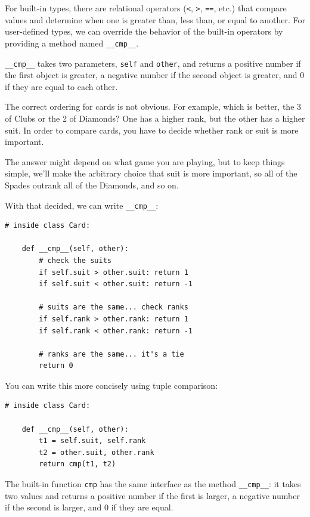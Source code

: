 \documentclass[10pt]{book}
\begin{document}
\begin{CJK}{UTF8}{gbsn}
For built-in types, there are relational operators
({\tt <}, {\tt >}, {\tt ==}, etc.)
that compare
values and determine when one is greater than, less than, or equal to
another.  For user-defined types, we can override the behavior of
the built-in operators by providing a method named
\verb"__cmp__".  

\verb"__cmp__" takes two parameters, {\tt self} and {\tt other},
and returns a positive number if the first object is greater, a
negative number if the second object is greater, and 0 if they are
equal to each other.

The correct ordering for cards is not obvious.
For example, which
is better, the 3 of Clubs or the 2 of Diamonds?  One has a higher
rank, but the other has a higher suit.  In order to compare
cards, you have to decide whether rank or suit is more important.

The answer might depend on what game you are playing, but to keep
things simple, we'll make the arbitrary choice that suit is more
important, so all of the Spades outrank all of the Diamonds,
and so on.

With that decided, we can write \verb"__cmp__":

\begin{verbatim}
# inside class Card:

    def __cmp__(self, other):
        # check the suits
        if self.suit > other.suit: return 1
        if self.suit < other.suit: return -1

        # suits are the same... check ranks
        if self.rank > other.rank: return 1
        if self.rank < other.rank: return -1

        # ranks are the same... it's a tie
        return 0    
\end{verbatim}
%
You can write this more concisely using tuple comparison:

\begin{verbatim}
# inside class Card:

    def __cmp__(self, other):
        t1 = self.suit, self.rank
        t2 = other.suit, other.rank
        return cmp(t1, t2)
\end{verbatim}
%
The built-in function {\tt cmp} has the same interface as
the method \verb"__cmp__": it takes two values and returns
a positive number if the first is larger, a negative number
if the second is larger, and 0 if they are equal.



\end{CJK}
\end{document}
